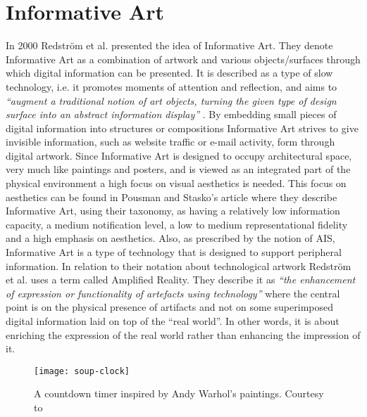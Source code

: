\section{Informative Art}
In 2000 Redström et al. \cite{redstrom2000informative} presented the idea of Informative Art. They denote Informative Art as a combination of artwork and various objects/surfaces through which digital information can be presented. It is described as a type of slow technology, i.e. it promotes moments of attention and reflection, and aims to \emph{“augment a traditional notion of art objects, turning the given type of design surface into an abstract information display”} \cite[p.~104]{redstrom2000informative}. By embedding small pieces of digital information into structures or compositions Informative Art strives to give invisible information, such as website traffic or e-mail activity, form through digital artwork. Since Informative Art is designed to occupy architectural space, very much like paintings and posters, and is viewed as an integrated part of the physical environment a high focus on visual aesthetics is needed. This focus on aesthetics can be found in Pousman and Stasko’s \cite{pousman2006taxonomy} article where they describe Informative Art, using their taxonomy, as having a relatively low information capacity, a medium notification level, a low to medium representational fidelity and a high emphasis on aesthetics. Also, as prescribed by the notion of AIS, Informative Art is a type of technology that is designed to support peripheral information. In relation to their notation about technological artwork Redström et al. uses a term called Amplified Reality. They describe it as \emph{“the enhancement of expression or functionality of artefacts using technology”} \cite[p.~105]{pousman2006taxonomy} where the central point is on the physical presence of artifacts and not on some superimposed digital information laid on top of the “real world”. In other words, it is about enriching the expression of the real world rather than enhancing the impression of it.

\begin{figure}[h]
	\centering
	\texttt{[image: soup-clock]}
	\caption{A countdown timer inspired by Andy Warhol's paintings. Courtesy to \cite{holmquist2003informative}}
	\label{fig:soup-clock}
\end{figure}

